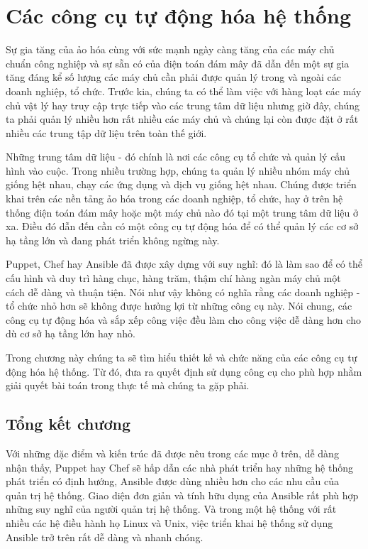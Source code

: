 \chapter{Các công cụ tự động hóa hệ thống}

\newpage
\clearpage

Sự gia tăng của ảo hóa cùng với sức mạnh ngày càng tăng của các máy chủ chuẩn công nghiệp và sự sẵn có của điện toán đám mây đã dẫn đến một sự gia tăng đáng kể số lượng các máy chủ cần phải được quản lý trong và ngoài các doanh nghiệp, tổ chức. Trước kia, chúng ta có thể làm việc với hàng loạt các máy chủ vật lý hay truy cập trực tiếp vào các trung tâm dữ liệu nhưng giờ đây, chúng ta phải quản lý nhiều hơn rất nhiều các máy chủ và chúng lại còn được đặt ở rất nhiều các trung tập dữ liệu trên toàn thế giới.

Những trung tâm dữ liệu - đó chính là nơi các công cụ tổ chức và quản lý cấu hình vào cuộc. Trong nhiều trường hợp, chúng ta quản lý nhiều nhóm máy chủ giống hệt nhau, chạy các ứng dụng và dịch vụ giống hệt nhau. Chúng được triển khai trên các nền tảng ảo hóa trong các doanh nghiệp, tổ chức, hay ở trên hệ thống điện toán đám mây hoặc một máy chủ nào đó tại một trung tâm dữ liệu ở xa. Điều đó dẫn đến cần có một công cụ tự động hóa để có thể quản lý các cơ sở hạ tầng lớn và đang phát triển không ngừng này.

Puppet, Chef hay Ansible đã được xây dựng với suy nghĩ: đó là làm sao để có thể cấu hình và duy trì hàng chục, hàng trăm, thậm chí hàng ngàn máy chủ một cách dễ dàng và thuận tiện. Nói như vậy không có nghĩa rằng các doanh nghiệp - tổ chức nhỏ hơn sẽ không được hưởng lợi từ những công cụ này. Nói chung, các công cụ tự động hóa và sắp xếp công việc đều làm cho công việc dễ dàng hơn cho dù cơ sở hạ tầng lớn hay nhỏ.

Trong chương này chúng ta sẽ tìm hiểu thiết kế và chức năng của các công cụ tự động hóa hệ thống. Từ đó, đưa ra quyết định sử dụng công cụ cho phù hợp nhằm giải quyết bài toán trong thực tế mà chúng ta gặp phải.

\newpage
\clearpage

\newpage
\clearpage

\newpage
\clearpage

\newpage
\clearpage

\section{Tổng kết chương}

Với những đặc điểm và kiến trúc đã được nêu trong các mục ở trên, dễ dàng nhận thấy, Puppet hay Chef sẽ hấp dẫn các nhà phát triển hay những hệ thống phát triển có định hướng, Ansible được dùng nhiều hơn cho các nhu cầu của quản trị hệ thống. Giao diện đơn giản và tính hữu dụng của Ansible rất phù hợp những suy nghĩ của người quản trị hệ thống. Và trong một hệ thống với rất nhiều các hệ điều hành họ Linux và Unix, việc triển khai hệ thống sử dụng Ansible trở trên rất dễ dàng và nhanh chóng.

